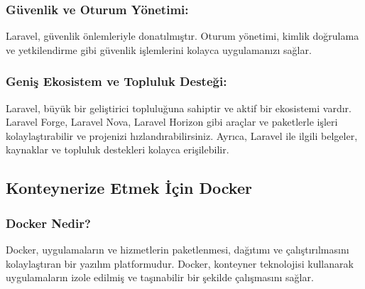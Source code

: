 \subsubsection{Güvenlik ve Oturum Yönetimi:}
Laravel, güvenlik önlemleriyle donatılmıştır. Oturum yönetimi, kimlik doğrulama ve yetkilendirme gibi güvenlik işlemlerini kolayca uygulamanızı sağlar.
\subsubsection{Geniş Ekosistem ve Topluluk Desteği: }
Laravel, büyük bir geliştirici topluluğuna sahiptir ve aktif bir ekosistemi vardır. Laravel Forge, Laravel Nova, Laravel Horizon gibi araçlar ve paketlerle işleri kolaylaştırabilir ve projenizi hızlandırabilirsiniz. Ayrıca, Laravel ile ilgili belgeler, kaynaklar ve topluluk destekleri kolayca erişilebilir.
\subsection{Konteynerize Etmek İçin \textbf{Docker }}
\subsubsection{Docker Nedir?}

Docker, uygulamaların ve hizmetlerin paketlenmesi, dağıtımı ve çalıştırılmasını kolaylaştıran bir yazılım platformudur. Docker, konteyner teknolojisi kullanarak uygulamaların izole edilmiş ve taşınabilir bir şekilde çalışmasını sağlar.

